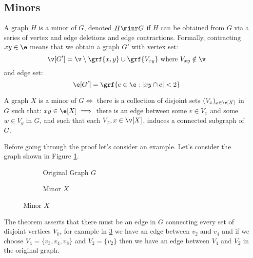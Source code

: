 \subsection{Minors}
A graph $H$ is a minor of $G$, denoted $H \minr G$ if $H$ can be obtained from $G$ via a series of vertex and edge deletions and edge contractions. Formally, contracting $xy \in \e$ means that we obtain a graph $G'$ with vertex set:
\begin{equation*}
    \v[G'] = \v \setminus \grf{x, y} \cup \grf{V_{xy}} \text{ where } V_{xy} \notin \v
\end{equation*}
and edge set:
\begin{equation*}
    \e[G'] = \grf{e \in \e: |xy \cap e| < 2}
\end{equation*}
\begin{customproposition}{1.25}
    \label{proposition:1.25}
    A graph $X$ is a minor of $G \iff$ there is a collection of disjoint sets $(V_x)_{x \in \v[X]}$ in $G$ such that: $xy \in \e[X] \implies$ there is an edge between some $v \in V_x$ and some $w \in V_y$ in $G$, and such that each $V_x, x \in \v[X]$, induces a connected subgraph of $G$.
\end{customproposition}
Before going through the proof let's consider an example. Let's consider the graph shown in Figure \ref{fig:original_graph_1.25}.
\begin{figure}[h]
    \centering
    \begin{subfigure}[h]{0.4\textwidth}
        
        \caption{Original Graph $G$}
        \label{fig:original_graph_1.25}
    \end{subfigure}
    \begin{subfigure}[h]{0.4\textwidth}
        
        \caption{Minor $X$}
        \label{fig:minor_graph_1.25}
    \end{subfigure}
\end{figure}
The theorem asserts that there must be an edge in $G$ connecting every set of disjoint vertices $V_k$, for example in \ref{fig:minor_graph_1.25} we have an edge between $v_2$ and $v_4$ and if we choose $V_4 = \{v_3, v_4, v_8\}$ and $V_2 = \{v_2\}$ then we have an edge between $V_4$ and $V_2$ in the original graph.

